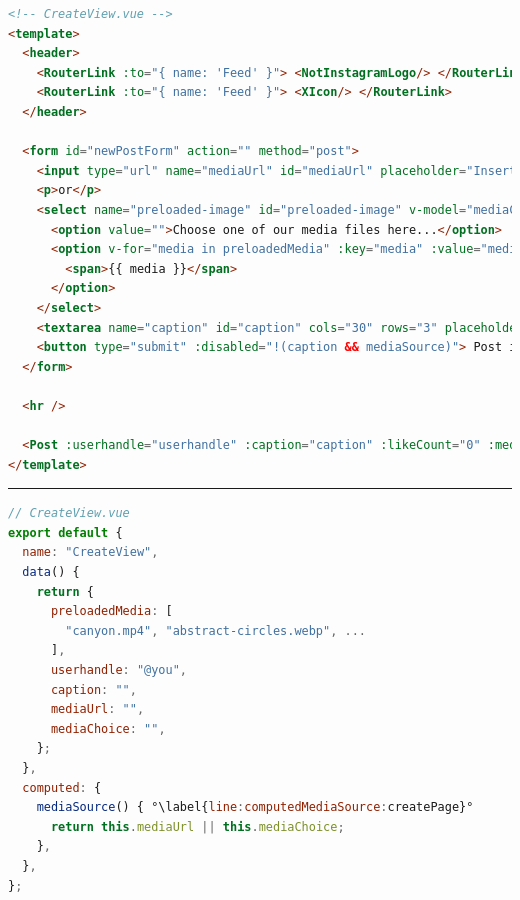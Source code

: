 \documentclass[a4paper, 12pt]{article}
\begin{document}
\vspace{1cm}
\begin{lstlisting}[caption=Create page in Vue.js (Template), label={lst:Vue:Create:Template}, language=HTML]
<!-- CreateView.vue -->
<template>
  <header>
    <RouterLink :to="{ name: 'Feed' }"> <NotInstagramLogo/> </RouterLink>
    <RouterLink :to="{ name: 'Feed' }"> <XIcon/> </RouterLink>
  </header>

  <form id="newPostForm" action="" method="post">
    <input type="url" name="mediaUrl" id="mediaUrl" placeholder="Insert your media URL here..." v-model="mediaUrl" />
    <p>or</p>
    <select name="preloaded-image" id="preloaded-image" v-model="mediaChoice">
      <option value="">Choose one of our media files here...</option>
      <option v-for="media in preloadedMedia" :key="media" :value="media">
        <span>{{ media }}</span>
      </option>
    </select>
    <textarea name="caption" id="caption" cols="30" rows="3" placeholder="Type your caption here" v-model="caption"/>
    <button type="submit" :disabled="!(caption && mediaSource)"> Post it! </button>
  </form>

  <hr />

  <Post :userhandle="userhandle" :caption="caption" :likeCount="0" :mediaSource="mediaSource" :hideActionIcons="true" />
</template>
\end{lstlisting}
\hrule
\begin{lstlisting}[caption=Create page in Vue.js (Script), label={lst:Vue:Create:Script}, language=JavaScript, firstnumber=25, escapechar=°]
// CreateView.vue
export default {
  name: "CreateView",
  data() {
    return {
      preloadedMedia: [
        "canyon.mp4", "abstract-circles.webp", ...
      ],
      userhandle: "@you",
      caption: "",
      mediaUrl: "",
      mediaChoice: "",
    };
  },
  computed: {
    mediaSource() { °\label{line:computedMediaSource:createPage}°
      return this.mediaUrl || this.mediaChoice;
    },
  },
};
\end{lstlisting}
\vspace{1cm}
\end{document}
